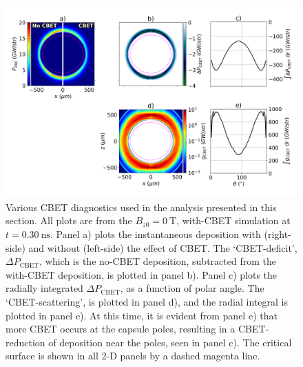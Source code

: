 \begin{figure}[t!]
    \includegraphics[width=\linewidth]{Results2/Images/magcbet_analysis.png}
    \centering
    \caption{Various \ac{CBET} diagnostics used in the analysis presented in this section.
    All plots are from the $B_{z0}=0\ \text{T}$, with-\ac{CBET} simulation at $t=0.30\ \text{ns}$.
    Panel a) plots the instantaneous deposition with (right-side) and without (left-side) the effect of \ac{CBET}.
    The `\ac{CBET}-deficit', $\Delta P_{\text{CBET}}$, which is the no-\ac{CBET} deposition, subtracted from the with-\ac{CBET} deposition, is plotted in panel b).
    Panel c) plots the radially integrated $\Delta P_{\text{CBET}}$, as a function of polar angle.
    The `\ac{CBET}-scattering', is plotted in panel d), and the radial integral is plotted in panel e).
    At this time, it is evident from panel e) that more \ac{CBET} occurs at the capsule poles, resulting in a \ac{CBET}-reduction of deposition near the poles, seen in panel c).
    The critical surface is shown in all 2-D panels by a dashed magenta line.}%
    \label{fig:Res2_magcbet_analysis}
\end{figure}

